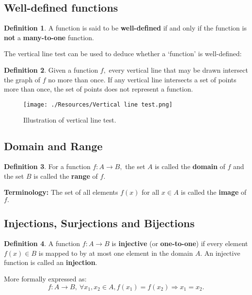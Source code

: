 \documentclass[12pt, a4paper]{article}
\newcommand{\imply}{\Rightarrow}
\theoremstyle{definition}
\newtheorem{definition}{Definition}[section]
\theoremstyle{plain}
\begin{document}
\subsection{Well-defined functions}

\begin{definition}
A function is said to be \textbf{well-defined} if and only if the function is \textbf{not} a \textbf{many-to-one} function.
\end{definition}

The vertical line test can be used to deduce whether a `function' is well-defined: 

\begin{definition}
Given a function $f,$ every vertical line that may be drawn intersect the graph of $f$ no more than once. If any vertical line intersects a set of points more than once, the set of points does not represent a function. 
\end{definition}

\begin{figure}[H]
\centering
\texttt{[image: ./Resources/Vertical line test.png]}
\caption{Illustration of vertical line test.}
\label{fig:Vertical line test}
\end{figure}

\subsection{Domain and Range}

\begin{definition}
For a function $f : A \to B,$ the set $A$ is called the \textbf{domain} of $f$ and the set $B$ is called the \textbf{range} of $f.$
\end{definition}

\textbf{Terminology:} The set of all elements $f(x)$ for all $x \in A$ is called the \textbf{image} of $f.$

\subsection{Injections, Surjections and Bijections}

\begin{definition}
A function $f : A \to B$ is \textbf{injective} (or \textbf{one-to-one}) if every element $f(x) \in B$ is mapped to by at most one element in the domain $A.$ An injective function is called an \textbf{injection}.

More formally expressed as: $$f: A \rightarrow B, \ \forall x_1,x_2 \in A, f(x_1) = f(x_2) \imply x_1 = x_2.$$ 
\end{definition}
\end{document}
